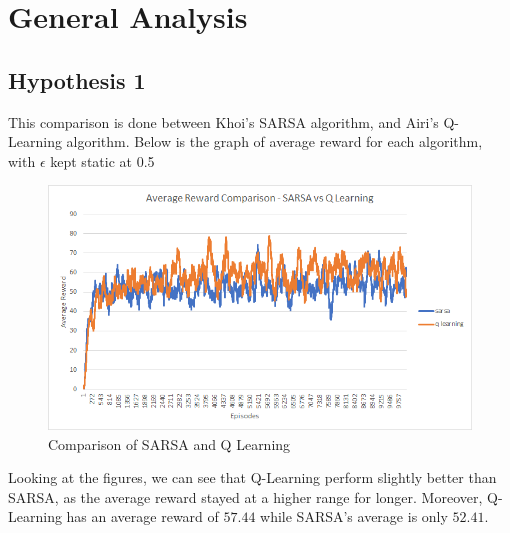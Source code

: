 \section{General Analysis}


\subsection{Hypothesis 1}

This comparison is done between Khoi's SARSA algorithm, and Airi's Q-Learning algorithm. Below is the graph of average reward
for each algorithm, with $\epsilon$ kept static at 0.5

\begin{figure}[H] %
    \centering
    \includegraphics[width=0.75\linewidth]{sarsa-vs-ql.png}
    \caption{Comparison of SARSA and Q Learning}
\end{figure}

Looking at the figures, we can see that Q-Learning perform slightly better than SARSA, as the average reward stayed at a higher range for longer.
Moreover, Q-Learning has an average reward of $57.44$ while SARSA's average is only $52.41$.

